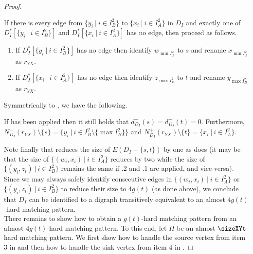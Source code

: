 \begin{proof}
\begin{identification rule}
\label{rr:YX}
If there is every edge from $\{y_i~|~i \in I_B^2\}$ to $\{x_i~|~i \in I_A^2\}$ in $D_I$ 
and exactly one of $D_I^*[\{y_i~|~i \in I_B^2\}]$ and $D_I^*[\{x_i~|~i \in I_A^2\}]$ has no edge, then proceed as follows.
\begin{enumerate}
\item If $D_I^*[\{y_i~|~i \in I_B^2\}]$ has no edge then identify $w_{\min I_A^2}$ to $s$ and
rename $x_{\min I_A^2}$ as $r_{YX}$.
\item If $D_I^*[\{x_i~|~i \in I_A^2\}]$ has no edge then identify $z_{\max I_B^2}$ to $t$ and 
rename $y_{\max I_B^2}$ as $r_{YX}$.
\end{enumerate}
\end{identification rule}

Symmetrically to , we have the following.

\begin{claim}
\label{clm:renamingYX}
If  has been applied then it still holds that $d^-_{D_I}(s) = d^+_{D_I}(t) = 0$.
Furthermore, $N^-_{D_I}(r_{YX}) \setminus \{s\} = \{y_i~|~i \in I_B^2 \setminus \{\max I_B^2\}\}$ and $N^+_{D_I}(r_{YX}) \setminus \{t\} = \{x_i~|~i \in I_A^2\}$.
\end{claim}

Note finally that  reduces the size of $E(D_I - \{s,t\})$ by one as does  (it may be that the size of $\{(w_i,x_i)~|~i \in I_A^2\}$ reduces by two while the size of $\{(y_i,z_i)~|~i \in I_B^2\}$ remains the same if .2 and .1 are applied, and vice-versa). Since we may always safely identify consecutive edges in $\{(w_i,x_i)~|~i \in I_A^2\}$ or $\{(y_i,z_i)~|~i \in I_B^2\}$ to reduce their size to $4g(t)$ (as done above), we conclude that $D_I$ can be identified to a digraph transitively equivalent to an almost $4g(t)$-hard matching pattern.\\

There remains to show how to obtain a $g(t)$-hard matching pattern from an almost $4g(t)$-hard matching pattern. To this end, let $H$ be an almost $\sizeXYt$-hard matching pattern. We first show how to handle the source vertex from item 3 in  and then how to handle the sink vertex from item 4 in .


\end{proof}
